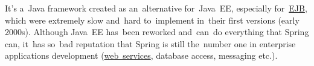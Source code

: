 \label{springframework}
It's a~Java framework created as an~alternative for~Java~EE, especially for~\hyperref[ejb]{EJB}, which were extremely slow and~hard to~implement in~their first versions (early 2000s). Although Java~EE has~been reworked and~can~do everything that Spring can, it~has so~bad reputation that Spring is still the~number one in enterprise applications development (\hyperref[webserviceapplication]{web~services}, database access, messaging etc.).

